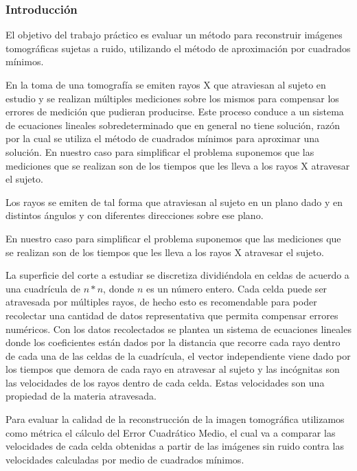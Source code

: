 \subsubsection*{Introducción}
\par El objetivo del trabajo práctico es evaluar un método para reconstruir imágenes tomográficas sujetas a ruido, utilizando el método de aproximación por cuadrados mínimos.

\par En la toma de una tomografía se emiten rayos X que atraviesan al sujeto en estudio y se realizan múltiples mediciones sobre los mismos para compensar los errores de medición que pudieran producirse. Este proceso conduce a un sistema de ecuaciones lineales sobredeterminado que en general no tiene solución, razón por la cual se utiliza el método de cuadrados mínimos para aproximar una solución.
En nuestro caso para simplificar el problema suponemos que las mediciones que se realizan son de los tiempos que les lleva a los rayos X atravesar el sujeto.

\par Los rayos se emiten de tal forma que atraviesan al sujeto en un plano dado y en distintos ángulos y con diferentes direcciones sobre ese plano.
\par En nuestro caso para simplificar el problema suponemos que las mediciones que se realizan son de los tiempos que les lleva a los rayos X atravesar el sujeto.
\par La superficie del corte a estudiar se discretiza dividiéndola en celdas de acuerdo a una cuadrícula de $n*n$, donde $n$ es un número entero. Cada celda puede ser atravesada por múltiples rayos, de hecho esto es recomendable para poder recolectar una cantidad de datos representativa que permita compensar errores numéricos.
Con los datos recolectados se plantea un sistema de ecuaciones lineales donde los coeficientes están dados por la distancia que recorre cada rayo dentro de cada una de las celdas de la cuadrícula, el vector independiente viene dado por los tiempos que demora de cada rayo en atravesar al sujeto y las incógnitas son las velocidades de los rayos dentro de cada celda. Estas velocidades son una propiedad de la materia atravesada.

\par Para evaluar la calidad de la reconstrucción de la imagen tomográfica utilizamos como métrica el cálculo del Error Cuadrático Medio, el cual va a comparar las velocidades de cada celda obtenidas a partir de las imágenes sin ruido contra las velocidades calculadas por medio de cuadrados mínimos.

